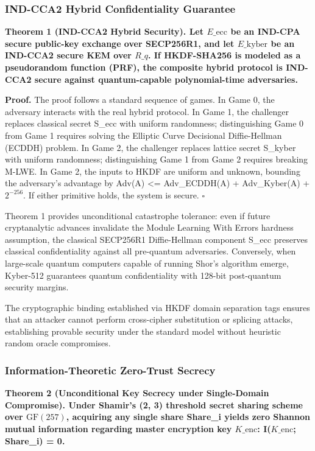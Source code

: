 \documentclass[5p,times]{elsarticle}
\newenvironment{proof}{\noindent\textbf{Proof.}}{\hfill$\square$\par\medskip}
\begin{document}
\subsubsection{IND-CCA2 Hybrid Confidentiality Guarantee}

\noindent\textbf{\textbf{Theorem 1 (IND-CCA2 Hybrid Security).} Let $E\_{\text{ecc}}$ be an IND-CPA secure public-key exchange over SECP256R1, and let $E\_{\text{kyber}}$ be an IND-CCA2 secure KEM over $R\_q$. If HKDF-SHA256 is modeled as a pseudorandom function (PRF), the composite hybrid protocol is IND-CCA2 secure against quantum-capable polynomial-time adversaries.}

\begin{proof}
The proof follows a standard sequence of games. In Game 0, the adversary interacts with the real hybrid protocol. In Game 1, the challenger replaces classical secret S\_ecc with uniform randomness; distinguishing Game 0 from Game 1 requires solving the Elliptic Curve Decisional Diffie-Hellman (ECDDH) problem. In Game 2, the challenger replaces lattice secret S\_kyber with uniform randomness; distinguishing Game 1 from Game 2 requires breaking M-LWE. In Game 2, the inputs to HKDF are uniform and unknown, bounding the adversary's advantage by Adv(A) <= Adv\_ECDDH(A) + Adv\_Kyber(A) + $2^{-256}$. If either primitive holds, the system is secure.
\end{proof}

Theorem 1 provides unconditional catastrophe tolerance: even if future cryptanalytic advances invalidate the Module Learning With Errors hardness assumption, the classical SECP256R1 Diffie-Hellman component S\_ecc preserves classical confidentiality against all pre-quantum adversaries. Conversely, when large-scale quantum computers capable of running Shor's algorithm emerge, Kyber-512 guarantees quantum confidentiality with 128-bit post-quantum security margins.

The cryptographic binding established via HKDF domain separation tags ensures that an attacker cannot perform cross-cipher substitution or splicing attacks, establishing provable security under the standard model without heuristic random oracle compromises.


\subsubsection{Information-Theoretic Zero-Trust Secrecy}

\noindent\textbf{\textbf{Theorem 2 (Unconditional Key Secrecy under Single-Domain Compromise).} Under Shamir's (2, 3) threshold secret sharing scheme over $\text{GF}(257)$, acquiring any single share Share\_i yields zero Shannon mutual information regarding master encryption key $K\_{\text{enc}}$: I($K\_{\text{enc}}$; Share\_i) = 0.}
\end{document}
